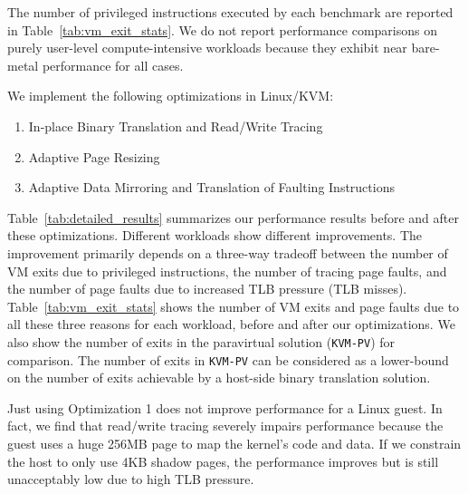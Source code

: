 The number of privileged instructions executed by each benchmark are reported in Table~\ref{tab:vm_exit_stats}. We do not report performance comparisons on purely user-level compute-intensive workloads because they exhibit near bare-metal performance for all cases.

We implement the following optimizations in Linux/KVM:
\begin{enumerate}
  \item In-place Binary Translation and Read/Write Tracing
  \item Adaptive Page Resizing
  \item Adaptive Data Mirroring and Translation of Faulting Instructions
\end{enumerate}
Table~\ref{tab:detailed_results} summarizes our performance results before and after these optimizations. Different workloads show different improvements. The improvement primarily depends on a three-way tradeoff between the number of VM exits due to privileged instructions, the number of tracing page faults, and the number of page faults due to increased TLB pressure (TLB misses). Table~\ref{tab:vm_exit_stats} shows the number of VM exits and page faults due to all these three reasons for each workload, before and after our optimizations. We also show the number of exits in the paravirtual solution ({\tt KVM-PV}) for comparison. The number of exits in {\tt KVM-PV} can be considered as a lower-bound on the number of exits achievable by a host-side binary translation solution.

Just using Optimization 1 does not improve performance for a Linux guest. In fact, we find that read/write tracing severely impairs performance because the guest uses a huge 256MB page to map the kernel's code and data. If we constrain the host to only use 4KB shadow pages, the performance improves but is still unacceptably low due to high TLB pressure.

